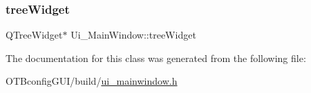 \mbox{\label{class_ui___main_window_a082c92b8f4b52f2160ba8c58e94118c8}} 
\subsubsection{\texorpdfstring{tree\+Widget}{treeWidget}}
{\footnotesize\ttfamily Q\+Tree\+Widget$\ast$ Ui\+\_\+\+Main\+Window\+::tree\+Widget}



The documentation for this class was generated from the following file\+:\begin{DoxyCompactItemize}
\item 
O\+T\+Bconfig\+G\+U\+I/build/\hyperlink{ui__mainwindow_8h}{ui\+\_\+mainwindow.\+h}\end{DoxyCompactItemize}
